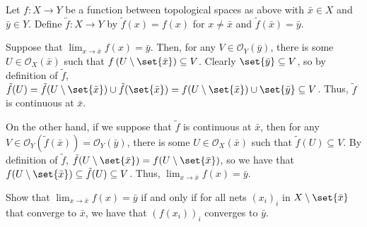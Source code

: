 \documentclass[10pt]{mypackage}
\begin{document}
\begin{solution}
  Let $f\colon X\to Y$ be a function between topological spaces as above with $\bar x\in X$ and $\bar y\in Y$. Define $\tilde{f}\colon X\to Y$ by $\tilde f(x) = f(x)$ for $x \neq \bar x$ and $\tilde f\left(\bar x\right) = \bar y$.

  Suppose that $\lim_{x\to\bar x}f(x) = \bar y$. Then, for any $V\in \mathcal{O}_Y\left(\bar y\right)$, there is some $U\in\mathcal{O}_X\left(\bar x\right)$ such that $f\left(U\setminus \set{\bar x}\right)\subseteq V$. Clearly $\set{\bar y}\subseteq V$, so by definition of $\tilde f$, $\tilde f(U) = \tilde f(U\setminus \set{\bar x}) \cup \tilde f(\set{\bar x}) = f(U\setminus\set{\bar x}) \cup \set{\bar y} \subseteq V$. Thus, $\tilde f$ is continuous at $\bar x$.

  On the other hand, if we suppose that $\tilde f$ is continuous at $\bar x$, then for any $V \in \mathcal{O}_Y\left(\tilde f\left(\bar x\right)\right) = \mathcal{O}_Y(\bar y)$, there is some $U\in\mathcal{O}_X(\bar x)$ such that $\tilde f(U) \subseteq V$. By definition of $\tilde f$, $\tilde f(U\setminus \set{\bar x}) = f(U\setminus \set{\bar x})$, so we have that $f(U\setminus\set{\bar x}) \subseteq \tilde f(U) \subseteq V$. Thus, $\lim_{x\to\bar x}f(x) = \bar y$.
\end{solution}
\begin{problem}[Problem I.5]
  Show that $\lim_{x\to\bar{x}}f(x) = \bar{y}$ if and only if for all nets $\left( x_i \right)_i$ in $ X\setminus \set{\bar{x}} $ that converge to $\bar{x}$, we have that $\left( f\left( x_i \right) \right)_{i}$ converges to $\bar{y}$.
\end{problem}
\end{document}
